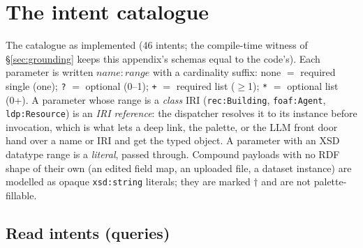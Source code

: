 \documentclass[11pt,a4paper]{article}
\theoremstyle{remark}
\begin{document}



\appendix

\cleardoublepage
\section{The intent catalogue}\label{app:intents}

The catalogue as implemented (46 intents; the compile-time witness of
\S\ref{sec:grounding} keeps this appendix's schemas equal to the code's). Each
parameter is written $\mathit{name} : \mathit{range}$ with a cardinality suffix:
none $=$ required single (\textsf{one}); \texttt{?} $=$ optional (0--1);
\texttt{+} $=$ required list ($\ge$1); \texttt{*} $=$ optional list (0+). A
parameter whose range is a \emph{class} IRI (\texttt{rec:Building},
\texttt{foaf:Agent}, \texttt{ldp:Resource}) is an \emph{IRI reference}: the
dispatcher resolves it to its instance before invocation, which is what lets a
deep link, the palette, or the LLM front door hand over a name or IRI and get the
typed object. A parameter with an XSD datatype range is a \emph{literal},
passed through. Compound payloads with no RDF shape of their own (an edited field
map, an uploaded file, a dataset instance) are modelled as opaque
\texttt{xsd:string} literals; they are marked $\dagger$ and are not palette-fillable.

\subsection{Read intents (queries)}\label{app:reads}
\end{document}
